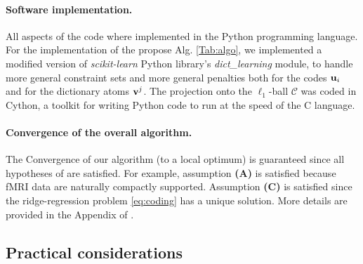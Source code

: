 \paragraph{Software implementation.} All aspects of the code where
implemented in the Python programming language. 
For the implementation of the propose Alg. \ref{Tab:algo}, we
implemented a modified version of \textit{scikit-learn} Python library's
  \textit{dict\_learning} module, to handle more general constraint sets
  and more general penalties both for the codes $\mathbf{u}_i$ and for the
  dictionary atoms $\mathbf{v}^j$. The projection onto the $\ell_1$-ball $\mathcal C$ was coded in Cython, a toolkit for writing Python code to run at the speed of the C language.

\paragraph*{Convergence of the overall algorithm.}
The Convergence of our algorithm (to a local optimum) is guaranteed since all hypotheses of  \cite{mairal2010} are satisfied. For example, assumption \textbf{(A)} is satisfied because fMRI data are naturally compactly supported. Assumption \textbf{(C)} is satisfied since the ridge-regression problem \eqref{eq:coding} has a unique solution. More details are provided in the
Appendix of  \cite{dohmatob2016}.

\subsection{Practical considerations}
